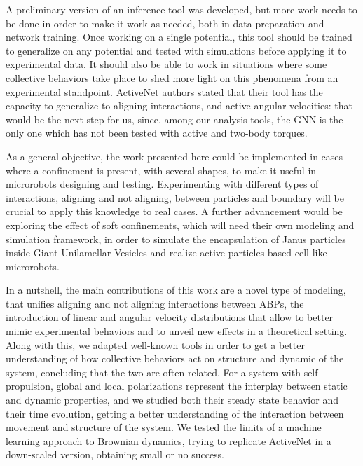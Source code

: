 \documentclass[../../master_thesis_np.tex]{subfiles}
\begin{document}
A preliminary version of an inference tool was developed, but more work needs to be done in order to make it work as needed, both in data preparation and network training.
Once working on a single potential, this tool should be trained to generalize on any potential and tested with simulations before applying it to experimental data.
It should also be able to work in situations where some collective behaviors take place to shed more light on this phenomena from an experimental standpoint.
ActiveNet \cite{ruiz-garcia_discovering_2024} authors stated that their tool has the capacity to generalize to aligning interactions, and active angular velocities: that would be the next step for us, since, among our analysis tools, the GNN is the only one which has not been tested with active and two-body torques.

As a general objective, the work presented here could be implemented in cases where a confinement is present, with several shapes, to make it useful in microrobots designing and testing.
Experimenting with different types of interactions, aligning and not aligning, between particles and boundary will be crucial to apply this knowledge to real cases.
A further advancement would be exploring the effect of soft confinements, which will need their own modeling and simulation framework, in order to simulate the encapsulation of Janus particles inside Giant Unilamellar Vesicles and realize active particles-based cell-like microrobots.

In a nutshell, the main contributions of this work are a novel type of modeling, that unifies aligning and not aligning interactions between ABPs, the introduction of linear and angular velocity distributions that allow to better mimic experimental behaviors and to unveil new effects in a theoretical setting.
Along with this, we adapted well-known tools in order to get a better understanding of how collective behaviors act on structure and dynamic of the system, concluding that the two are often related.
For a system with self-propulsion, global and local polarizations represent the interplay between static and dynamic properties, and we studied both their steady state behavior and their time evolution, getting a better understanding of the interaction between movement and structure of the system.
We tested the limits of a machine learning approach to Brownian dynamics, trying to replicate ActiveNet in a down-scaled version, obtaining small or no success.
\end{document}
